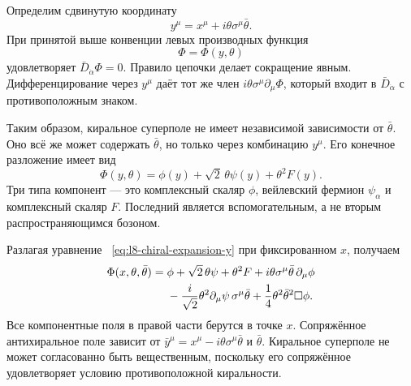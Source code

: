 Определим сдвинутую координату
\begin{equation}
y^\mu=x^\mu+i\theta\sigma^\mu\bar\theta.
\label{eq:l8-chiral-coordinate}
\end{equation}
При принятой выше конвенции левых производных функция
\begin{equation}
\Phi=\Phi(y,\theta)
\label{eq:l8-chiral-solution}
\end{equation}
удовлетворяет \(\bar D_{\dot\alpha}\Phi=0\). Правило цепочки делает сокращение явным. Дифференцирование через \(y^\mu\) даёт тот же член \(i\theta\sigma^\mu\partial_\mu\Phi\), который входит в \(\bar D_{\dot\alpha}\) с противоположным знаком.

Таким образом, киральное суперполе не имеет независимой зависимости от \(\bar\theta\). Оно всё же может содержать \(\bar\theta\), но только через комбинацию \(y^\mu\). Его конечное разложение имеет вид
\begin{equation}
\Phi(y,\theta)
=\phi(y)+\sqrt2\,\theta\psi(y)+\theta^2F(y).
\label{eq:l8-chiral-expansion-y}
\end{equation}
Три типа компонент — это комплексный скаляр \(\phi\), вейлевский фермион \(\psi_\alpha\) и комплексный скаляр \(F\). Последний является вспомогательным, а не вторым распространяющимся бозоном.

\begin{classroomqa}
\end{classroomqa}

Разлагая уравнение ~\eqref{eq:l8-chiral-expansion-y} при фиксированном \(x\), получаем
\begin{align}
\Phi(x,\theta,\bar\theta)
={}&\phi
+\sqrt2\,\theta\psi
+\theta^2F
+i\theta\sigma^\mu\bar\theta\,\partial_\mu\phi
\notag\\
&-\frac{i}{\sqrt2}\theta^2
\partial_\mu\psi\,\sigma^\mu\bar\theta
+\frac14\theta^2\bar\theta^2\Box\phi.
\label{eq:l8-chiral-expansion-x}
\end{align}
Все компонентные поля в правой части берутся в точке \(x\). Сопряжённое антихиральное поле зависит от
\(\bar y^\mu=x^\mu-i\theta\sigma^\mu\bar\theta\) и \(\bar\theta\). Киральное суперполе не может согласованно быть вещественным, поскольку его сопряжённое удовлетворяет условию противоположной киральности.

